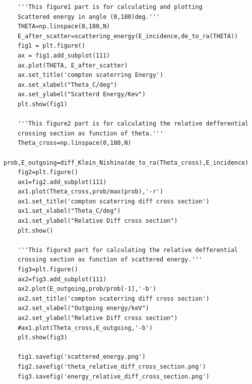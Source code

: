 \documentclass[12pt]{article}
\begin{document}
\begin{lstlisting}
	'''This figure1 part is for calculating and plotting 
	Scattered energy in angle (0,180)deg.''' 		
	THETA=np.linspace(0,180,N)
	E_after_scatter=scattering_energy(E_incidence,de_to_ra(THETA))
	fig1 = plt.figure()
	ax = fig1.add_subplot(111)
	ax.plot(THETA, E_after_scatter)
	ax.set_title('compton scaterring Energy')
	ax.set_xlabel("Theta_C/deg")
	ax.set_ylabel("Scatterd Energy/Kev")
	plt.show(fig1)
	
	'''This figure2 part is for calculating the relative defferential 
	crossing section as function of theta.'''
	Theta_cross=np.linspace(0,180,N)
	prob,E_outgoing=diff_Klein_Nishina(de_to_ra(Theta_cross),E_incidence)
	fig2=plt.figure()
	ax1=fig2.add_subplot(111)
	ax1.plot(Theta_cross,prob/max(prob),'-r')
	ax1.set_title('compton scaterring diff cross section')
	ax1.set_xlabel("Theta_C/deg")
	ax1.set_ylabel("Relative Diff cross section")
	plt.show()
	
	'''This figure3 part for calculating the relative defferential 
	crossing section as function of scattered energy.'''
	fig3=plt.figure()
	ax2=fig3.add_subplot(111)
	ax2.plot(E_outgoing,prob/prob[-1],'-b')
	ax2.set_title('compton scaterring diff cross section')
	ax2.set_xlabel("Outgoing energy/keV")
	ax2.set_ylabel("Relative Diff cross section")
	#ax1.plot(Theta_cross,E_outgoing,'-b')
	plt.show(fig3)
	
	fig1.savefig('scattered_energy.png')
	fig2.savefig('theta_relative_diff_cross_section.png')
	fig3.savefig('energy_relative_diff_cross_section.png')
	\end{lstlisting}
\end{document}
